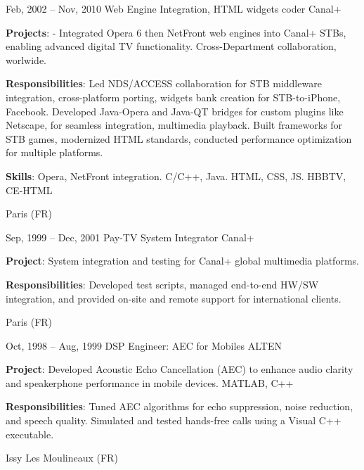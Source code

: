 \documentclass[
  a4paper,
   maincolor=cvblue,
   sectioncolor=cvblue,
   sidebarwidth=0.323\paperwidth,
]{fortysecondscv}
\begin{document}
\begin{cvtableNew}
  \cvitemRightNew
  {Feb, 2002 – Nov, 2010} %
  {Web Engine Integration, HTML widgets coder} %
  {Canal+} %
  {
    \vspace{1pt}
    \textbf{Projects}:
    - Integrated Opera 6 then NetFront web engines into Canal+ STBs, enabling advanced digital TV functionality. Cross-Department collaboration, worlwide. \par
    \vspace{4pt}
    \textbf{Responsibilities}:
    Led NDS/ACCESS collaboration for STB middleware integration,
    cross-platform porting, widgets bank creation for STB-to-iPhone, Facebook.
    Developed Java-Opera and Java-QT bridges for custom plugins like Netscape, for seamless integration, multimedia playback.
    Built frameworks for STB games, modernized HTML standards, conducted performance optimization for multiple platforms.

    \par
    \vspace{4pt}
    \textbf{Skills}: Opera, NetFront integration. C/C++, Java. HTML, CSS, JS. HBBTV, CE-HTML\par
  }
    {Paris (FR)} %
\end{cvtableNew}




\begin{cvtableNew}
  \cvitemRightNew
    {Sep, 1999 – Dec, 2001} %
    {Pay-TV System Integrator} %
    {Canal+} %
    {
      \vspace{1pt}
      \textbf{Project}: System integration and testing for Canal+ global multimedia platforms.\par
      \vspace{4pt}
      \textbf{Responsibilities}: Developed test scripts, managed end-to-end HW/SW integration, and provided on-site and remote support for international clients.\par
    }
    {Paris (FR)} %
\end{cvtableNew}


\begin{cvtableNew}
  \cvitemRightNew
    {Oct, 1998 – Aug, 1999} %
    {DSP Engineer: AEC for Mobiles} %
    {ALTEN} %
    {
      \vspace{1pt}
      \textbf{Project}: Developed Acoustic Echo Cancellation (AEC) to enhance audio clarity and speakerphone performance in mobile devices. MATLAB, C++\par
      \vspace{4pt}
      \textbf{Responsibilities}: Tuned AEC algorithms for echo suppression, noise reduction, and speech quality. Simulated and tested hands-free calls using a Visual C++ executable.\par
    }
    {Issy Les Moulineaux (FR)} %
\end{cvtableNew}
\end{document}
